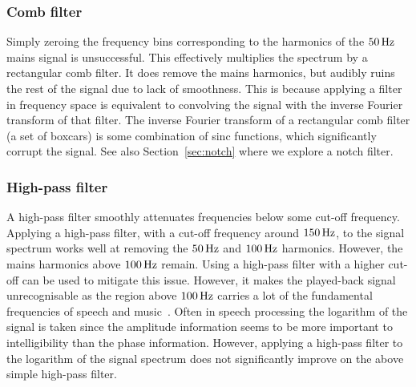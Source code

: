 \documentclass[paper-main.tex]{subfiles}
\begin{document}
\subsubsection{Comb filter}

Simply zeroing the frequency bins corresponding to the harmonics of the $50\,{\rm Hz}$ mains signal is unsuccessful. This effectively multiplies the spectrum by a rectangular comb filter. It does remove the mains harmonics, but audibly ruins the rest of the signal due to lack of smoothness. This is because applying a filter in frequency space is equivalent to convolving the signal with the inverse Fourier transform of that filter. The inverse Fourier transform of a rectangular comb filter (a set of boxcars) is some combination of sinc functions, which significantly corrupt the signal. 
See also Section~\ref{sec:notch} where we explore a notch filter. 


\subsubsection{High-pass filter}

A high-pass filter smoothly attenuates frequencies below some cut-off frequency. Applying a high-pass filter, with a cut-off frequency around $150\,{\rm Hz}$, to the signal spectrum works well at removing the $50\,{\rm Hz}$ and $100\,{\rm Hz}$ harmonics. However, the mains harmonics above $100\,{\rm Hz}$ remain. Using a high-pass filter with a higher cut-off can be used to mitigate this issue. However, it makes the played-back signal unrecognisable as the region above $100\,{\rm Hz}$ carries a lot of the fundamental frequencies of speech and music~\cite{speech_intelligibility}.
Often in speech processing the logarithm of the signal is taken since the amplitude information seems to be more important to intelligibility than the phase information. However, applying a high-pass filter to the logarithm of the signal spectrum does not significantly improve on the above simple high-pass filter.

\end{document}
